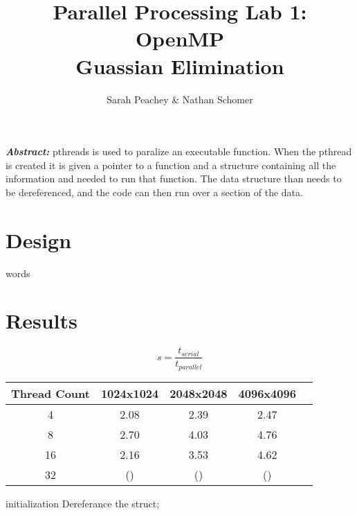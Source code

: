 \documentclass[12pt]{article}
\begin{document}
\title{Parallel Processing Lab 1: OpenMP \\ Guassian Elimination}
\author{Sarah Peachey \& Nathan Schomer}
\maketitle

\textbf{\textit{Abstract:}} pthreads is used to paralize an executable function. 
When the pthread is created it is given a pointer to a function and a structure containing 
all the information and needed to run that function. The data structure than needs to be 
dereferenced, and the code can then run over a section of the data. 

\newpage

\vspace{-1.5cm}
\section{Design}
\vspace{-0.25cm}
\qquad words 

\vspace{-0.6cm}
\section{Results}
\vspace{-0.4cm}
\qquad 


\begin{equation}
    s = \frac{t_{serial}}{t_{parallel}}
\end{equation}

\pagebreak
\begin{center}
\hspace*{-2.5cm}
\begin{tabular}{@{}|c|c|c|c|c|}
\hline
Thread Count & 1024x1024 & 2048x2048 & 4096x4096 \\
\hline
4 & 2.08 & 2.39 & 2.47 \\
\hline
8 & 2.70 & 4.03 & 4.76  \\
\hline 
16 & 2.16 & 3.53 & 4.62 \\
\hline 
32 & () & () & () \\
\hline
\end{tabular}
\hspace*{-2.5cm}
\end{center}

\vspace{1cm}
\begin{algorithm}[H]
\SetAlgoLined
{}
initialization\;
Dereferance the struct; 
\end{algorithm}

\end{document}
